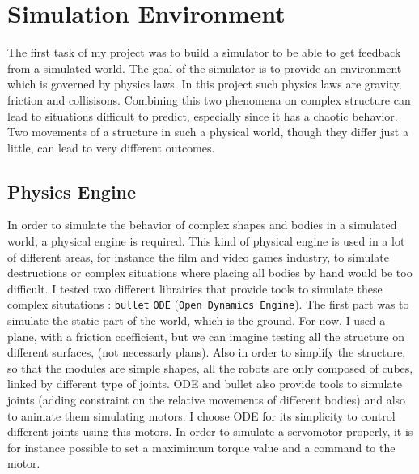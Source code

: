 
\chapter{Simulation Environment} %

\label{Chapter 1} %


The first task of my project was to build a simulator to be able to get feedback from a simulated world. The goal of the simulator is to provide an environment which is governed by physics laws. In this project such physics laws are gravity, friction and collisisons. Combining this two phenomena on complex structure can lead to situations difficult to predict, especially since it has a chaotic behavior. Two movements of a structure in such a physical world, though they differ just a little, can lead to very different outcomes.  

\section{Physics Engine}

In order to simulate the behavior of complex shapes and bodies in a simulated world, a physical engine is required. This kind of physical engine is used in a lot of different areas, for instance the film and video games industry, to simulate destructions or complex situations where placing all bodies by hand would be too difficult. I tested two different librairies that provide tools to simulate these complex situtations : \verb?bullet? \verb?ODE? (\verb?Open Dynamics Engine?). The first part was to simulate the static part of the world, which is the ground. For now, I used a plane, with a friction coefficient, but we can imagine testing all the structure on different surfaces, (not necessarly plans). Also in order to simplify the structure, so that the modules are simple shapes, all the robots are only composed of cubes, linked by different type of joints. ODE and bullet also provide tools to simulate joints (adding constraint on the relative movements of different bodies) and also to animate them simulating motors. I choose ODE for its simplicity to control different joints using this motors. In order to simulate a servomotor properly, it is for instance possible to set a maximimum torque value and a command to the motor.

